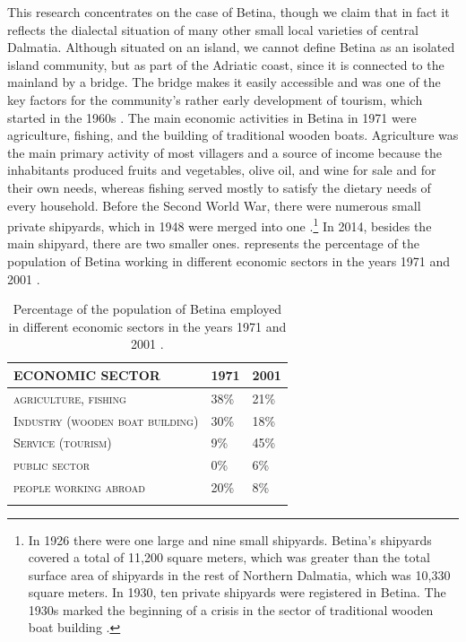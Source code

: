 \documentclass[output=paper]{LSP/langsci}
\begin{document}
This research concentrates on the case of Betina, though we claim that in fact it reflects the dialectal situation of many other small local varieties of central Dalmatia. Although situated on an island, we cannot define Betina as an isolated island community, but as part of the Adriatic coast, since it is connected to the mainland by a bridge. The bridge makes it easily accessible and was one of the key factors for the community’s rather early development of tourism, which started in the 1960s \citep[138]{kulusic_murterski_1984}. The main economic activities in Betina in 1971 were agriculture, fishing, and the building of traditional wooden boats. Agriculture was the main primary activity of most villagers and a source of income because the inhabitants produced fruits and vegetables, olive oil, and wine for sale and for their own needs, whereas fishing served mostly to satisfy the dietary needs of every household. Before the Second World War, there were numerous small private shipyards, which in 1948 were merged into one \citep[21]{filipi_betinska_1997}.\footnote{In 1926 there were one large and nine small shipyards. Betina’s shipyards covered a total of 11,200 square meters, which was greater than the total surface area of shipyards in the rest of Northern Dalmatia, which was 10,330 square meters. In 1930, ten private shipyards were registered in Betina. The 1930s marked the beginning of a crisis in the sector of traditional wooden boat building \citep[19]{filipi_betinska_1997}.} In 2014, besides the main shipyard, there are two smaller ones.  represents the percentage of the population of Betina working in different economic sectors in the years 1971 and 2001 \citep[21]{skracic_otok_2010}.

\begin{table}
\begin{tabular}{lll} 
\lsptoprule
ECONOMIC SECTOR & 1971 & 2001\\
\midrule
{\scshape agriculture, fishing} & 38\% & 21\%\\
{\scshape Industry (wooden boat building)} & 30\% & 18\%\\
{\scshape Service (tourism)} & 9\% & 45\%\\
{\scshape public sector} & 0\% & 6\%\\
{\scshape people working abroad} & 20\% & 8\%\\
\lspbottomrule
\end{tabular}
\caption{Percentage of the population of Betina employed in different economic sectors in the years 1971 and 2001 \citep{skracic_otok_2010}.}
\label{tab:1}
\end{table}
\end{document}
